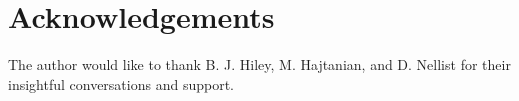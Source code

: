 \documentclass{article}
\begin{document}
\section{Acknowledgements}

The author would like to thank B. J. Hiley, M. Hajtanian, and D. Nellist for their insightful conversations and support.
\end{document}
